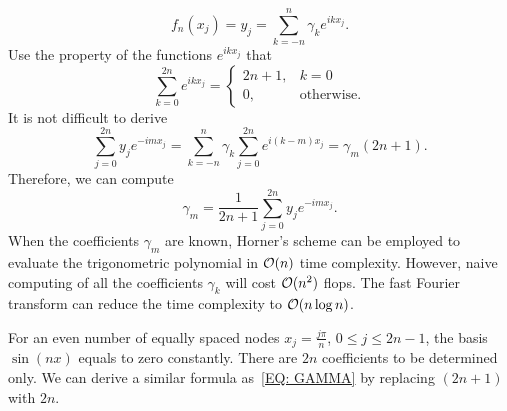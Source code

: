 \begin{equation}
    f_n(x_j) = y_j = \sum_{k=-n}^n \gamma_k e^{i k x_j}.
\end{equation}
Use the property of the functions $e^{ikx_j}$ that 
\begin{equation}
    \sum_{k=0}^{2n} e^{ik x_j} = \begin{cases}
        2n+1, & k = 0\\
        0, &\text{otherwise}.
    \end{cases}
\end{equation}
It is not difficult to derive 
\begin{equation}
    \sum_{j = 0}^{2n} y_j e^{-im x_j} = \sum_{k=-n}^{n} \gamma_k \sum_{j=0}^{2n} e^{i (k - m) x_j} = \gamma_{m} (2n+1).  
\end{equation}
Therefore, we can compute 
\begin{equation}\label{EQ: GAMMA}
    \gamma_m = \frac{1}{2n+1}  \sum_{j = 0}^{2n} y_j e^{-im x_j}.
\end{equation}
When the coefficients $\gamma_m$ are known, Horner's scheme can be employed to evaluate the trigonometric polynomial in $\mathcal O(n)$ time complexity.  However, naive computing of all the coefficients $\gamma_k$ will cost $\mathcal O(n^2)$ flops. The fast Fourier transform can reduce the time complexity to $\mathcal O(n\log n)$.
\begin{remark}
    For an even number of equally spaced nodes $x_j = \frac{j\pi}{n}$, $0\le j\le 2n-1$, the basis $\sin( n x)$ equals to zero constantly. There are $2n$ coefficients to be determined only. We can derive a similar formula as~\eqref{EQ: GAMMA} by replacing $(2n+1)$ with $2n$.
\end{remark}

